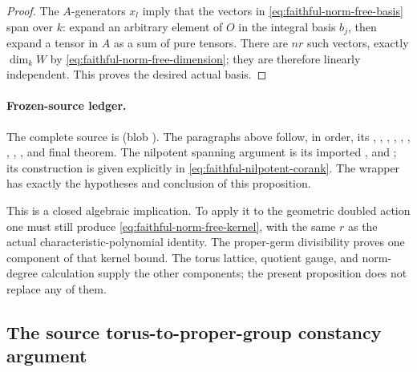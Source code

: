\begin{proof}
The \(A\)-generators \(x_l\) imply that the vectors in
\eqref{eq:faithful-norm-free-basis} span over \(k\):
expand an arbitrary element of \(O\) in the integral basis
\(b_j\), then expand a tensor in \(A\) as a sum of pure tensors.
There are \(nr\) such vectors, exactly \(\dim_k W\) by
\eqref{eq:faithful-norm-free-dimension}; they are therefore
linearly independent.  This proves the desired actual basis.
\end{proof}

\paragraph{Frozen-source ledger.}
The complete source is
\href{https://github.com/ChristianKudeba/alpoge-rh-verification/blob/alpoge-source-7cbf7a0c/src/Development/WeilBound/CoreStatements/TorusUniformisation/ChowMahlerFamilies/KernelRankAlgebraicBound.lean}
{}
(blob ).
The paragraphs above follow, in order, its
, , ,
, ,
, , ,
, and final theorem.
The nilpotent spanning argument is its imported
\href{https://github.com/ChristianKudeba/alpoge-rh-verification/blob/alpoge-source-7cbf7a0c/src/Development/WeilBound/CoreStatements/TorusUniformisation/ChowMahlerFamilies/JordanBasisNilpotent.lean}
{},
 and ;
its construction is given explicitly in
\eqref{eq:faithful-nilpotent-corank}.
The wrapper
\href{https://github.com/ChristianKudeba/alpoge-rh-verification/blob/alpoge-source-7cbf7a0c/src/Development/AutomorphicSpectrum/Proofs/AlgebraProofs/KernelRankBoundNormValuation.lean}
{}
has exactly the hypotheses and conclusion of this proposition.

This is a closed algebraic implication.
To apply it to the geometric doubled action one must still
produce \eqref{eq:faithful-norm-free-kernel}, with the same
\(r\) as the actual characteristic-polynomial identity.
The proper-germ divisibility proves one component of that
kernel bound.  The torus lattice, quotient gauge, and
norm-degree calculation supply the other components; the
present proposition does not replace any of them.


\subsection{The source torus-to-proper-group constancy argument}
\label{subsec:faithful-torus-proper-constant}

